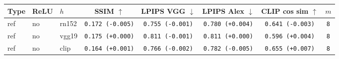\begin{tabular}{|l|l|l|c|c|c|c|c|}
\hline
Type & ReLU & $h$ & SSIM $\uparrow$ & LPIPS VGG $\downarrow$ & LPIPS Alex $\downarrow$ & CLIP cos sim $\uparrow$ & $m$ \\
\hline
ref & no & rn152 & \texttt{0.172 {\color{red}(-0.005)}} & \texttt{0.755 {\color{green}(-0.001)}} & \texttt{0.780 {\color{red}(+0.004)}} & \texttt{0.641 {\color{red}(-0.003)}} & \texttt{8} \\
\hline
ref & no & vgg19 & \texttt{0.175 {\color{black}(+0.000)}} & \texttt{0.811 {\color{green}(-0.001)}} & \texttt{0.811 {\color{black}(+0.000)}} & \texttt{0.596 {\color{green}(+0.004)}} & \texttt{8} \\
\hline
ref & no & clip & \texttt{0.164 {\color{green}(+0.001)}} & \texttt{0.766 {\color{green}(-0.002)}} & \texttt{0.782 {\color{green}(-0.005)}} & \texttt{0.655 {\color{green}(+0.007)}} & \texttt{8} \\
\hline
\end{tabular}
